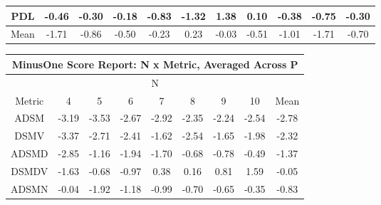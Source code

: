 \begin{longtable}{ | c || c | c | c | c | c | c | c | c | c || c |}
PDL &  \cellcolor[HTML]{FFF7F7} -0.46 &  \cellcolor[HTML]{FFF7F7} -0.30 &  \cellcolor[HTML]{FFF7F7} -0.18 &  \cellcolor[HTML]{FFE7E7} -0.83 &  \cellcolor[HTML]{FFDFDF} -1.32 &  \cellcolor[HTML]{DFDFFF} 1.38 &  \cellcolor[HTML]{FFFFFF} 0.10 &  \cellcolor[HTML]{FFF7F7} -0.38 &  \cellcolor[HTML]{FFEFEF} -0.75 &  \cellcolor[HTML]{FFF7F7} -0.30 \\
\hline
\hline
Mean  &  \cellcolor[HTML]{FFD7D7} -1.71 &  \cellcolor[HTML]{FFE7E7} -0.86 &  \cellcolor[HTML]{FFEFEF} -0.50 &  \cellcolor[HTML]{FFF7F7} -0.23 &  \cellcolor[HTML]{F7F7FF} 0.23 &  \cellcolor[HTML]{FFFFFF} -0.03 &  \cellcolor[HTML]{FFEFEF} -0.51 &  \cellcolor[HTML]{FFE7E7} -1.01 &  \cellcolor[HTML]{FFD7D7} -1.71 &  \cellcolor[HTML]{FFEFEF} -0.70 \\
\hline
\end{longtable}
\begin{longtable}{ | c || c | c | c | c | c | c | c || c |}
\hline
\multicolumn{9}{|c|}{ MinusOne Score Report: N x Metric, Averaged Across P } \\
\hline
\multicolumn{9}{|c|}{ N } \\
\hline
Metric & 4 & 5 & 6 & 7 & 8 & 9 & 10 & Mean\\
\hline
\hline
\endhead
ADSM &  \cellcolor[HTML]{FFAFAF} -3.19 &  \cellcolor[HTML]{FFA7A7} -3.53 &  \cellcolor[HTML]{FFBFBF} -2.67 &  \cellcolor[HTML]{FFB7B7} -2.92 &  \cellcolor[HTML]{FFC7C7} -2.35 &  \cellcolor[HTML]{FFC7C7} -2.24 &  \cellcolor[HTML]{FFBFBF} -2.54 &  \cellcolor[HTML]{FFB7B7} -2.78 \\
DSMV &  \cellcolor[HTML]{FFA7A7} -3.37 &  \cellcolor[HTML]{FFB7B7} -2.71 &  \cellcolor[HTML]{FFBFBF} -2.41 &  \cellcolor[HTML]{FFD7D7} -1.62 &  \cellcolor[HTML]{FFBFBF} -2.54 &  \cellcolor[HTML]{FFD7D7} -1.65 &  \cellcolor[HTML]{FFCFCF} -1.98 &  \cellcolor[HTML]{FFC7C7} -2.32 \\
ADSMD &  \cellcolor[HTML]{FFB7B7} -2.85 &  \cellcolor[HTML]{FFDFDF} -1.16 &  \cellcolor[HTML]{FFCFCF} -1.94 &  \cellcolor[HTML]{FFD7D7} -1.70 &  \cellcolor[HTML]{FFEFEF} -0.68 &  \cellcolor[HTML]{FFEFEF} -0.78 &  \cellcolor[HTML]{FFEFEF} -0.49 &  \cellcolor[HTML]{FFDFDF} -1.37 \\
DSMDV &  \cellcolor[HTML]{FFD7D7} -1.63 &  \cellcolor[HTML]{FFEFEF} -0.68 &  \cellcolor[HTML]{FFE7E7} -0.97 &  \cellcolor[HTML]{F7F7FF} 0.38 &  \cellcolor[HTML]{F7F7FF} 0.16 &  \cellcolor[HTML]{E7E7FF} 0.81 &  \cellcolor[HTML]{D7D7FF} 1.59 &  \cellcolor[HTML]{FFFFFF} -0.05 \\
ADSMN &  \cellcolor[HTML]{FFFFFF} -0.04 &  \cellcolor[HTML]{FFCFCF} -1.92 &  \cellcolor[HTML]{FFDFDF} -1.18 &  \cellcolor[HTML]{FFE7E7} -0.99 &  \cellcolor[HTML]{FFEFEF} -0.70 &  \cellcolor[HTML]{FFEFEF} -0.65 &  \cellcolor[HTML]{FFF7F7} -0.35 &  \cellcolor[HTML]{FFE7E7} -0.83 \\

\end{longtable}
